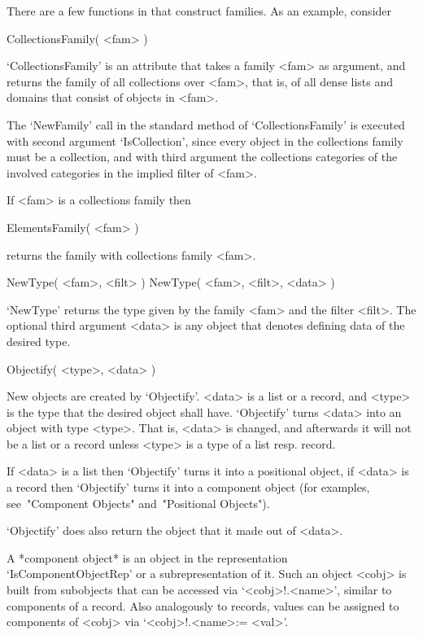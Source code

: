 There are a few functions in {\GAP} that construct families.
As an example, consider

\>CollectionsFamily( <fam> )

`CollectionsFamily' is an attribute that takes a family <fam> as
argument, and returns the family of all collections over <fam>,
that is, of all dense lists and domains that consist of objects in
<fam>.

The `NewFamily' call in the standard method of `CollectionsFamily'
is executed with second argument `IsCollection',
since every object in the collections family must be a collection,
and with third argument the collections categories of the involved
categories in the implied filter of <fam>.

If <fam> is a collections family then

\>ElementsFamily( <fam> )

returns the family with collections family <fam>.



\>NewType( <fam>, <filt> )
\)NewType( <fam>, <filt>, <data> )

`NewType' returns the type given by the family <fam>
and the filter <filt>.
The optional third argument <data> is any object that denotes defining
data of the desired type.



\>Objectify( <type>, <data> )

New objects are created by `Objectify'.
<data> is a list or a record, and <type> is the type that the desired
object shall have.
`Objectify' turns <data> into an object with type <type>.
That is, <data> is changed, and afterwards it will not be a list or a
record unless <type> is a type of a list resp. record.

If <data> is a list then `Objectify' turns it into a positional object,
if <data> is a record then `Objectify' turns it into a component object
(for examples, see~"Component Objects" and~"Positional Objects").

`Objectify' does also return the object that it made out of <data>.


A *component object* is an object in the representation
`IsComponentObjectRep' or a subrepresentation of it.
Such an object <cobj> is built from subobjects that can be accessed via
`<cobj>!.<name>', similar to components of a record.
Also analogously to records, values can be assigned to components of
<cobj> via `<cobj>!.<name>:= <val>'.


